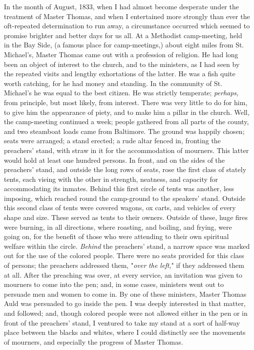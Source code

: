 In the month of August, 1833, when I had almost become desperate under
the treatment of Master Thomas, and when I entertained more strongly
than ever the oft-repeated determination to run away, a circumstance
occurred which seemed to promise brighter and better days for us all. At
a Methodist camp-meeting, held in the Bay Side, (a famous place for
camp-meetings,) about eight miles from St. Michael's, Master Thomas came
out with a profession of religion. He had long been an object of
interest to the church, and to the ministers, as I had seen by the
repeated visits and lengthy exhortations of the latter. He was a fish
quite worth catching, for he had money and standing. In the community of
St. Michael's he was equal to the best citizen. He was strictly
temperate; \emph{perhaps,} from principle, but most likely, from
interest. There was very little to do for him, to give him the
appearance of piety, and to make him a pillar in the church. Well, the
camp-meeting continued a week; people gathered from all parts of the
county, and two steamboat loads came from Baltimore. The ground was
happily chosen; seats were arranged; a stand erected; a rude altar
fenced in, fronting the preachers' stand, with straw in it for the
accommodation of mourners. This latter would hold at least one hundred
persons. In front, and on the sides of the preachers' stand, and outside
the long rows of seats, rose the first class of stately tents, each
vieing with the other in strength, neatness, and capacity for
accommodating its inmates. Behind this
{\protect\hypertarget{194}{}{}}first circle of tents was another, less
imposing, which reached round the camp-ground to the speakers' stand.
Outside this second class of tents were covered wagons, ox carts, and
vehicles of every shape and size. These served as tents to their owners.
Outside of these, huge fires were burning, in all directions, where
roasting, and boiling, and frying, were going on, for the benefit of
those who were attending to their own spiritual welfare within the
circle. \emph{Behind} the preachers' stand, a narrow space was marked
out for the use of the colored people. There were no seats provided for
this class of persons; the preachers addressed them, "\emph{over the
left,}" if they addressed them at all. After the preaching was over, at
every service, an invitation was given to mourners to come into the pen;
and, in some cases, ministers went out to persuade men and women to come
in. By one of these ministers, Master Thomas Auld was persuaded to go
inside the pen. I was deeply interested in that matter, and followed;
and, though colored people were not allowed either in the pen or in
front of the preachers' stand, I ventured to take my stand at a sort of
half-way place between the blacks and whites, where I could distinctly
see the movements of mourners, and especially the progress of Master
Thomas.

